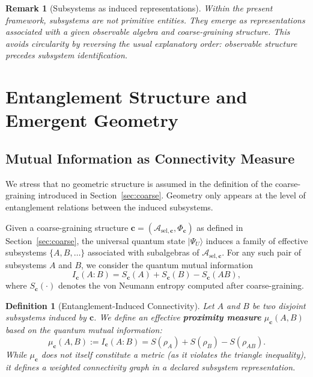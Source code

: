 \documentclass[12pt,a4paper]{article}
\newtheorem{definition}[theorem]{Definition}
\newtheorem{remark}[theorem]{Remark}
\begin{document}
\begin{remark}[Subsystems as induced representations]
Within the present framework, subsystems are not primitive entities. 
They emerge as representations associated with a given observable algebra and coarse-graining structure. 
This avoids circularity by reversing the usual explanatory order: observable structure precedes subsystem identification.
\end{remark}

\section{Entanglement Structure and Emergent Geometry}
\label{sec:geometry}

\subsection{Mutual Information as Connectivity Measure}

We stress that no geometric structure is assumed in the definition of the coarse-graining introduced in Section~\ref{sec:coarse}. 
Geometry only appears at the level of entanglement relations between the induced subsystems.

Given a coarse-graining structure $\mathbf{c} = (\mathcal{A}_{\mathrm{sel},\mathbf c},\Phi_{\mathbf c})$ as defined in Section~\ref{sec:coarse}, the universal quantum state $|\Psi_U\rangle$ induces a family of effective subsystems $\{A,B,\dots\}$ associated with subalgebras of $\mathcal{A}_{\mathrm{sel},\mathbf c}$.
For any such pair of subsystems $A$ and $B$, we consider the quantum mutual information
\begin{equation}
I_{\mathbf{c}}(A:B) = S_{\mathbf{c}}(A) + S_{\mathbf{c}}(B) - S_{\mathbf{c}}(AB),
\end{equation}
where $S_{\mathbf{c}}(\cdot)$ denotes the von Neumann entropy computed after coarse-graining.

\begin{definition}[Entanglement-Induced Connectivity]
\label{def:connectivity}
Let $A$ and $B$ be two disjoint subsystems induced by $\mathbf{c}$.
We define an effective \textbf{proximity measure} $\mu_{\mathbf{c}}(A,B)$ based on the quantum mutual information:
\begin{equation}
\mu_{\mathbf{c}}(A,B) := I_{\mathbf{c}}(A:B) = S(\rho_A) + S(\rho_B) - S(\rho_{AB}).
\end{equation}
While $\mu_{\mathbf{c}}$ does not itself constitute a metric (as it violates the triangle inequality), it defines a weighted connectivity graph in a declared subsystem representation.
\end{definition}
\end{document}
